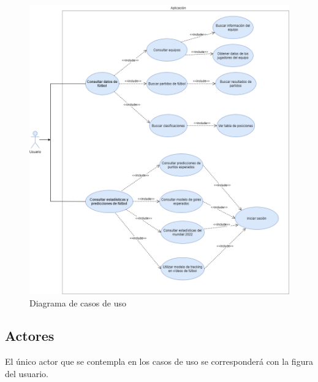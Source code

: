 \begin{figure}
    \centering
    \includegraphics[width=1\linewidth]{img/casoDeUso.png}
    \caption{Diagrama de casos de uso}
    \label{fig:enter-label}
\end{figure}

\subsection{Actores}
El único actor que se contempla en los casos de uso se corresponderá con la figura del usuario.


